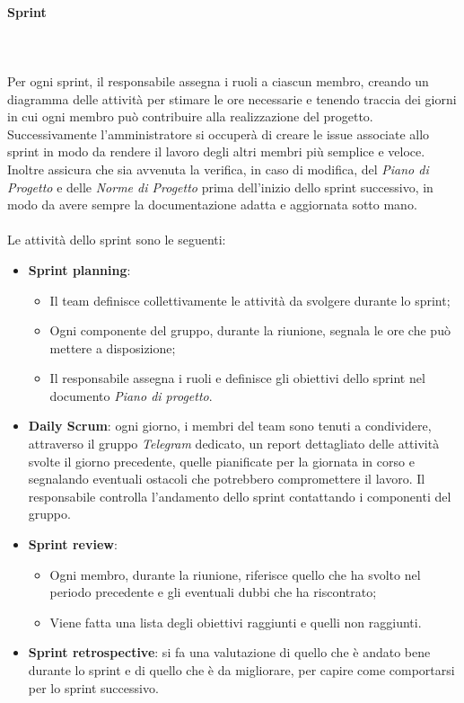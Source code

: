             \paragraph*{Sprint}\label{inf:sprint} ~\\\\
            Per ogni sprint, il responsabile assegna i ruoli a ciascun membro, creando un diagramma delle attività per stimare le ore
            necessarie e tenendo traccia dei giorni in cui ogni membro può contribuire alla realizzazione del progetto.
            Successivamente l'amministratore si occuperà di creare le issue associate allo sprint in modo da rendere il lavoro degli altri membri più semplice e veloce.
            Inoltre assicura che sia avvenuta la verifica, in caso di modifica, del \textit{Piano
            di Progetto} e delle \textit{Norme di Progetto} prima dell'inizio dello sprint successivo, in modo da avere sempre la
            documentazione adatta e aggiornata sotto mano.\\\\
            Le attività dello sprint sono le seguenti:
            \begin{itemize}
                \item \textbf{Sprint planning}: 
                \begin{itemize}
                    \item Il team definisce collettivamente le attività da svolgere durante lo sprint;
                    \item Ogni componente del gruppo, durante la riunione, segnala le ore che può mettere a disposizione;
                    \item Il responsabile assegna i ruoli e definisce gli obiettivi dello sprint nel documento \textit{Piano di progetto}.
                \end{itemize}
                \item \textbf{Daily Scrum}: ogni giorno, i membri del team sono tenuti a condividere, attraverso il gruppo \textit{Telegram} dedicato,
                un report dettagliato delle attività svolte il giorno precedente,
                quelle pianificate per la giornata in corso e segnalando eventuali ostacoli che potrebbero compromettere il lavoro.
                Il responsabile controlla l'andamento dello sprint contattando i componenti del gruppo.
                \item \textbf{Sprint review}:
                \begin{itemize}
                    \item Ogni membro, durante la riunione, riferisce quello che ha svolto nel periodo precedente e gli eventuali dubbi che ha riscontrato;
                    \item Viene fatta una lista degli obiettivi raggiunti e quelli non raggiunti.
                \end{itemize}
                \item \textbf{Sprint retrospective}: si fa una valutazione di quello che è andato bene durante lo sprint e di
                quello che è da migliorare, per capire come comportarsi per lo sprint successivo.
            \end{itemize}

